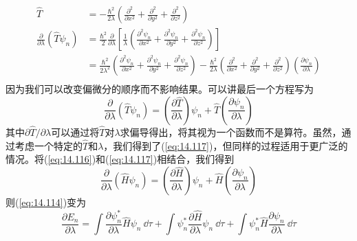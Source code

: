     \begin{equation*}
        \begin{aligned}
            \hat{T} &= -\frac{\hbar^2}{2\lambda} \left(\frac{\partial^2}{\partial x^2} + \frac{\partial^2}{\partial y^2} + \frac{\partial^2}{\partial z^2}\right) \\
            \frac{\partial}{\partial \lambda} \left(\hat{T}\psi_n\right) &= \frac{\hbar^2}{2} \frac{\partial}{\partial \lambda} \left[\frac{1}{\lambda}\left(\frac{\partial^2 \psi_n}{\partial x^2} + \frac{\partial^2 \psi_n}{\partial y^2} + \frac{\partial^2 \psi_n}{\partial z^2}\right)\right] \\
            &= \frac{\hbar^2}{2\lambda^2} \left(\frac{\partial^2 \psi_n}{\partial x^2} + \frac{\partial^2 \psi_n}{\partial y^2} + \frac{\partial^2 \psi_n}{\partial z^2}\right) - \frac{\hbar^2}{2\lambda} \left(\frac{\partial^2}{\partial x^2} + \frac{\partial^2}{\partial y^2} + \frac{\partial^2}{\partial z^2}\right) \left(\frac{\partial \psi_n}{\partial \lambda}\right) \\
        \end{aligned}
    \end{equation*}
    因为我们可以改变偏微分的顺序而不影响结果。可以讲最后一个方程写为
    \begin{equation}
        \frac{\partial}{\partial \lambda} \left(\hat{T}\psi_n\right) = \left(\frac{\partial \hat{T}}{\partial \lambda}\right) \psi_n + \hat{T} \left(\frac{\partial \psi_n}{\partial \lambda}\right)
        \label{eq:14.117}
    \end{equation}
    其中$\partial \hat{T} / \partial \lambda$可以通过将$\hat{T}$对$\lambda$求偏导得出，将其视为一个函数而不是算符。虽然，通过考虑一个特定的$\hat{T}$和$\lambda$，我们得到了(\ref{eq:14.117})，但同样的过程适用于更广泛的情况。将(\ref{eq:14.116})和(\ref{eq:14.117})相结合，我们得到
    \begin{equation}
        \frac{\partial}{\partial \lambda} \left(\hat{H}\psi_n\right) = \left(\frac{\partial \hat{H}}{\partial \lambda}\right) \psi_n + \hat{H} \left(\frac{\partial \psi_n}{\partial \lambda}\right)
        \label{eq:14.118}
    \end{equation}
    则(\ref{eq:14.114})变为
    \begin{equation}
        \frac{\partial E_n}{\partial \lambda} = \int \frac{\partial \psi_n^*}{\partial \lambda} \hat{H} \psi_n \:\dd \tau + \int \psi_n^* \frac{\partial \hat{H}}{\partial \lambda} \psi_n \:\dd \tau + \int \psi_n^* \hat{H} \frac{\partial \psi_n}{\partial \lambda} \:\dd \tau
        \label{eq:14.119}
    \end{equation}
